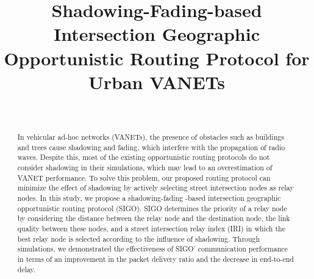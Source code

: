 \documentclass[conference]{IEEEtran}
\begin{document}



\title{Shadowing-Fading-based Intersection Geographic Opportunistic Routing Protocol for Urban VANETs}
\author{
\\



}


\maketitle

\begin{abstract}

In vehicular ad-hoc networks (VANETs), the presence of obstacles such as buildings and trees cause shadowing and fading, which interfere with the propagation of radio waves. Despite this, most of the existing opportunistic routing protocols do not consider shadowing in  their simulations, which may lead to an overestimation of VANET performance. 
To solve this problem, our proposed routing protocol can minimize the effect of shadowing by actively selecting street intersection nodes as relay nodes. 
In this study, we propose a shadowing-fading -based intersection geographic opportunistic routing protocol (SIGO). 
SIGO determines the priority of a relay node by considering the distance between the relay node and the destination node, the link quality between these nodes, and a street intersection relay index (IRI) in which the best relay node is selected according to the influence of shadowing.
Through simulations, we demonstrated the effectiveness of SIGO' communication performance in terms of an improvement in the packet delivery ratio and the decrease in end-to-end delay.

\end{abstract}
\end{document}
